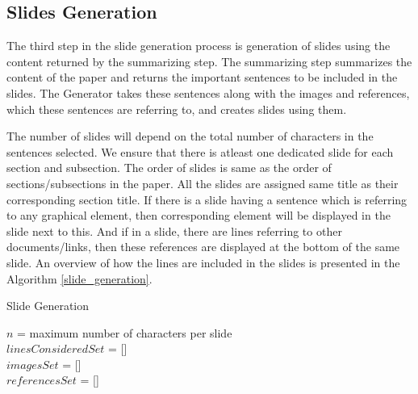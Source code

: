 \subsection{Slides Generation}

The third step in the slide generation process is generation of slides using 
the content returned by the summarizing step. The summarizing step summarizes 
the content of the paper and returns the important sentences to be included in the slides.
The Generator takes these sentences along with the images and references, which these
sentences are referring to, and creates slides using them.

The number of slides will depend on the total number of characters in the sentences selected.
We ensure that there is atleast one dedicated slide for each section and subsection.
The order of slides is same as the order of sections/subsections in the paper.
All the slides are assigned same title as their corresponding section title.
If there is a slide having a sentence which is referring to any graphical element, then
corresponding element will be displayed in the slide next to this. And if in a slide,
there are lines referring to other documents/links, then these references are displayed
at the bottom of the same slide. An overview of how the lines are included in the
slides is presented in the Algorithm \ref{slide_generation}.

\begin{algorithm}[H]
 \SetLine %
 \caption{Slide Generation}\label{slide_generation}
 $n$ = maximum number of characters per slide\\
 $linesConsideredSet$ = []\\
 $imagesSet$ = []\\
 $referencesSet$ = []\\
\end{algorithm}
